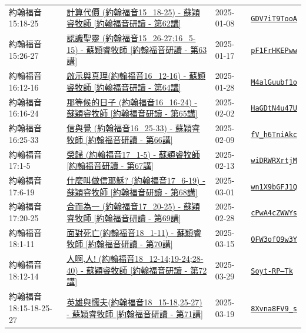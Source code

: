 \documentclass{book}
\begin{document}
{\begin{xltabular}{\textwidth}{|p{0.15\textwidth} p{0.6\textwidth}|p{0.07\textwidth} p{0.1\textwidth}|}
約翰福音 15:18-25 & \hyperref[sec:GDV7iT9TooA]{計算代價 (約翰福音15\_18-25) - 蘇穎睿牧師 [約翰福音研讀 - 第62講]} & 2025-01-08 & \href{https://youtube.com/watch?v=GDV7iT9TooA}{\texttt{GDV7iT9TooA}} \\
約翰福音 15:26-27 & \hyperref[sec:pF1FrHKEPww]{認識聖靈 (約翰福音15\_26-27;16\_5-15) - 蘇穎睿牧師 [約翰福音研讀 - 第63講]} & 2025-01-17 & \href{https://youtube.com/watch?v=pF1FrHKEPww}{\texttt{pF1FrHKEPww}} \\
約翰福音 16:12-16 & \hyperref[sec:M4alGuubf1o]{啟示與真理(約翰福音16\_12-16) - 蘇穎睿牧師 [約翰福音研讀 - 第64講]} & 2025-01-28 & \href{https://youtube.com/watch?v=M4alGuubf1o}{\texttt{M4alGuubf1o}} \\
約翰福音 16:16-24 & \hyperref[sec:HaGDtN4u47U]{那等候的日子 (約翰福音16\_16-24) - 蘇穎睿牧師 [約翰福音研讀 - 第65講]} & 2025-02-02 & \href{https://youtube.com/watch?v=HaGDtN4u47U}{\texttt{HaGDtN4u47U}} \\
約翰福音 16:25-33 & \hyperref[sec:fV_h6TniAkc]{信與覺 (約翰福音16\_25-33) - 蘇穎睿牧師 [約翰福音研讀 - 第66講]} & 2025-02-09 & \href{https://youtube.com/watch?v=fV_h6TniAkc}{\texttt{fV\_h6TniAkc}} \\
約翰福音 17:1-5 & \hyperref[sec:wiDRWRXrtjM]{榮歸 (約翰福音17\_1-5) - 蘇穎睿牧師 [約翰福音研讀 - 第67講]} & 2025-02-13 & \href{https://youtube.com/watch?v=wiDRWRXrtjM}{\texttt{wiDRWRXrtjM}} \\
約翰福音 17:6-19 & \hyperref[sec:wn1X9bGFJ1Q]{什麼叫做信耶穌? (約翰福音17\_6-19) - 蘇穎睿牧師 [約翰福音研讀 - 第68講]} & 2025-03-01 & \href{https://youtube.com/watch?v=wn1X9bGFJ1Q}{\texttt{wn1X9bGFJ1Q}} \\
約翰福音 17:20-25 & \hyperref[sec:cPwA4cZWWYs]{合而為一 (約翰福音17\_20-25) - 蘇穎睿牧師 [約翰福音研讀 - 第69講]} & 2025-02-28 & \href{https://youtube.com/watch?v=cPwA4cZWWYs}{\texttt{cPwA4cZWWYs}} \\
約翰福音 18:1-11 & \hyperref[sec:OFW3ofO9w3Y]{面對死亡(約翰福音18\_1-11) - 蘇穎睿牧師 [約翰福音研讀 - 第70講]} & 2025-03-15 & \href{https://youtube.com/watch?v=OFW3ofO9w3Y}{\texttt{OFW3ofO9w3Y}} \\
約翰福音 18:12-14 & \hyperref[sec:Soyt_RP__Tk]{人啊,人! (約翰福音18\_12-14;19-24;28-40) - 蘇穎睿牧師 [約翰福音研讀 - 第72講]} & 2025-03-29 & \href{https://youtube.com/watch?v=Soyt-RP--Tk}{\texttt{Soyt-RP--Tk}} \\
約翰福音 18:15-18-25-27 & \hyperref[sec:8Xvna8FV9_s]{英雄與懦夫(約翰福音18\_15-18,25-27) - 蘇穎睿牧師 [約翰福音研讀 - 第71講]} & 2025-03-19 & \href{https://youtube.com/watch?v=8Xvna8FV9_s}{\texttt{8Xvna8FV9\_s}} \\

\end{xltabular}}
\end{document}
